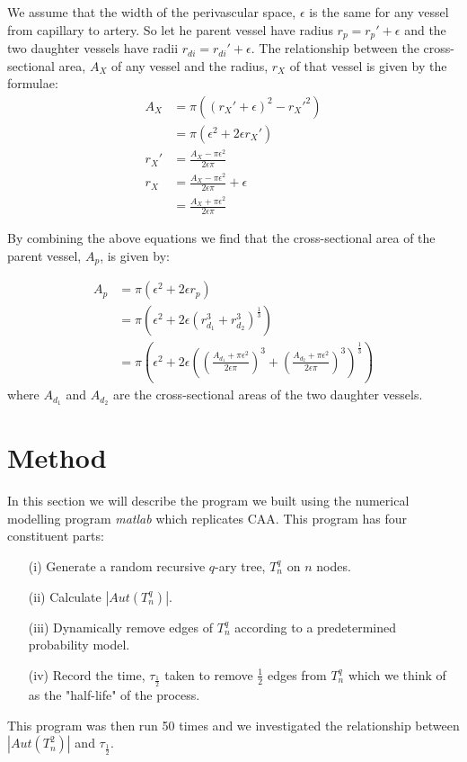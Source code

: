 \documentclass[12pt]{article} %
\theoremstyle{definition}
\begin{document}
We assume that the width of the perivascular space, $\epsilon$ is the same for any vessel from capillary to
 artery.  So let he parent vessel have radius $r_{p} = r_{p}' + \epsilon$ and the two 
daughter vessels have radii $r_{di} = r_{di}' + \epsilon$.
The relationship between the cross-sectional area, $A_{X}$ of any vessel and the radius, $r_{X}$ 
of that vessel is given by the formulae:
\begin{align*}
 A_{X} &= \pi((r_{X}' + \epsilon)^{2} - r_{X}'^{2})\\
 &= \pi(\epsilon^{2} + 2\epsilon r_{X}')\\
 r_{X}' &= \frac{A_{X} - \pi\epsilon^{2}}{2\epsilon\pi}\\
 r_{X} &=  \frac{A_{X} - \pi\epsilon^{2}}{2\epsilon\pi} + \epsilon \\
 &= \frac{A_{X} + \pi\epsilon^{2}}{2\epsilon\pi}
\end{align*}

By combining the above equations we find that the cross-sectional area of the parent
 vessel, $A_{p}$, is given by:

\begin{align*}
A_{p} &= \pi(\epsilon^{2} + 2\epsilon r_{p}) \\
&= \pi\left(\epsilon^{2} + 2\epsilon (r_{d_{1}}^{3} + r_{d_{2}}^{3})^{\frac{1}{3}}\right)\\
&= \pi\left(\epsilon^{2} + 2\epsilon \left(\left( \frac{A_{d_{1}} + \pi\epsilon^{2}}{2\epsilon\pi} \right)^{3} + \left( \frac{A_{d_{2}} + \pi\epsilon^{2}}{2\epsilon\pi} \right)^{3}\right)^{\frac{1}{3}}\right)
\end{align*}
where $A_{d_{1}}$ and $A_{d_{2}}$ are the cross-sectional areas of the two daughter vessels.



\section{Method}\label{sec:meth}

In this section we will describe the program we built using the numerical modelling program \emph{matlab} \cite{matlab} which replicates CAA.  This program has four constituent parts:
\begin{itemize}
\item[(i)]Generate a random recursive $q$-ary tree, $T^{q}_{n}$ on $n$ nodes.
\item[(ii)]Calculate $|Aut(T^{q}_{n})|$.
\item[(iii)]Dynamically remove edges of $T^{q}_{n}$ according to a predetermined probability model.
\item[(iv)]Record the time, $\tau_{\frac{1}{2}}$ taken to remove $\frac{1}{2}$ edges from $T^{q}_{n}$ which we think of as the "half-life" of the process.
\end{itemize} 
This program was then run 50 times and we investigated the relationship between $|Aut(T_{n}^{2})|$ and $\tau_{\frac{1}{2}}$.   
\end{document}
